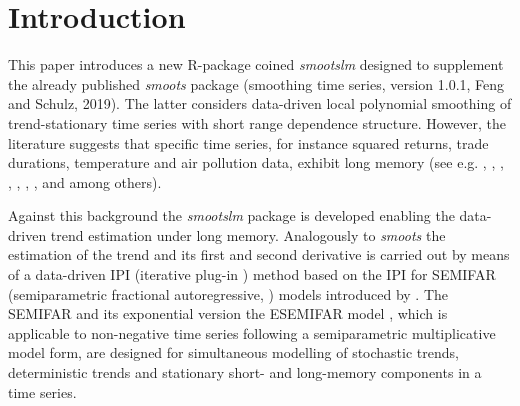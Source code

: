 \documentclass[12pt]{article}
\begin{document}
\section{Introduction}
This paper introduces a new R-package coined \textit{smootslm} designed to supplement the already published \textit{smoots} package (smoothing time series, version 1.0.1, Feng and Schulz, 2019). The latter considers data-driven local polynomial smoothing of trend-stationary time series with short range dependence structure. However, the literature suggests that specific time series, for instance squared returns, trade durations, temperature and air pollution data, exhibit long memory (see e.g. \cite{ding1993long}, \cite{ding1996modeling}, \cite{andersen1997intraday}, \cite{andersen1999forecasting}, \cite{baillie2002modeling}, \cite{cotter2005uncovering}, \cite{beran2015modelling}, \citet{beran2017statistics} and \citet{gil2020long} among others).  
  
Against this background the \textit{smootslm} package is developed enabling the data-driven trend estimation under long memory. Analogously to \textit{smoots} the estimation of the trend and its first and second derivative is carried out by means of a data-driven IPI (iterative plug-in \cite{gasser1991flexible}) method based on the IPI for SEMIFAR (semiparametric fractional autoregressive, \cite{beran2002semifar}) models introduced by \citet{beran2002iterative}. The SEMIFAR and its exponential version the ESEMIFAR model \citep{beran2015modelling}, which is applicable to non-negative time series following a semiparametric multiplicative model form, are designed for simultaneous modelling of stochastic trends, deterministic trends and stationary short- and long-memory components in a time series.
\end{document}
